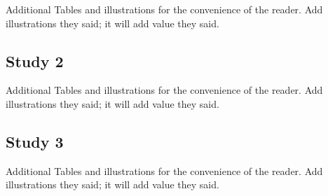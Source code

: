 \documentclass[
  man]{apa6}
\begin{document}
Additional Tables and illustrations for the convenience of the reader. Add illustrations they said; it will add value they said.

\subsection{Study 2}\label{study-2-2}

Additional Tables and illustrations for the convenience of the reader. Add illustrations they said; it will add value they said.

\subsection{Study 3}\label{study-3-2}

Additional Tables and illustrations for the convenience of the reader. Add illustrations they said; it will add value they said.
\end{document}
